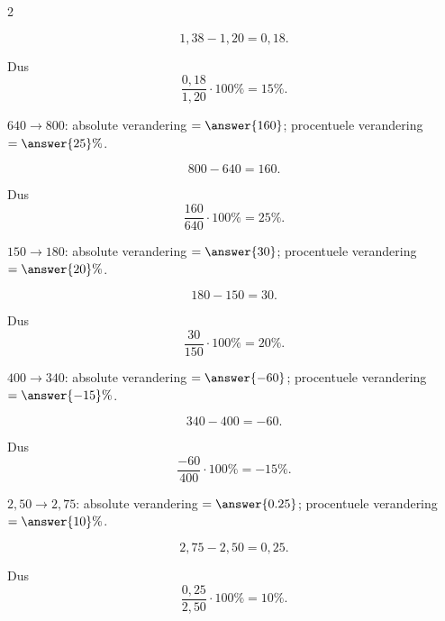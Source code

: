 \documentclass{ximera}
\begin{document}
\begin{oefening}{\oefB\ESS}
\begin{multicols}{2}
\begin{question}
    \begin{oplossing}
    \[
    1{,}38-1{,}20=0{,}18.
    \]
    
    Dus
    \[
    \dfrac{0{,}18}{1{,}20}\cdot100\%=15\%.
    \]
    \end{oplossing}
    \end{question}
    
    
    \begin{question}
    $640\to800$: absolute verandering $=\answer{160}$; procentuele verandering $=\answer{25}\%$.
    
    \begin{oplossing}
    \[
    800-640=160.
    \]
    
    Dus
    \[
    \dfrac{160}{640}\cdot100\%=25\%.
    \]
    \end{oplossing}
    \end{question}
    
    
    \begin{question}
    $150\to180$: absolute verandering $=\answer{30}$; procentuele verandering $=\answer{20}\%$.
    
    \begin{oplossing}
    \[
    180-150=30.
    \]
    
    Dus
    \[
    \dfrac{30}{150}\cdot100\%=20\%.
    \]
    \end{oplossing}
    \end{question}
    
    
    \begin{question}
    $400\to340$: absolute verandering $=\answer{-60}$; procentuele verandering $=\answer{-15}\%$.
    
    \begin{oplossing}
    \[
    340-400=-60.
    \]
    
    Dus
    \[
    \dfrac{-60}{400}\cdot100\%=-15\%.
    \]
    \end{oplossing}
    \end{question}
    
    
    \begin{question}
    $2{,}50\to2{,}75$: absolute verandering $=\answer{0.25}$; procentuele verandering $=\answer{10}\%$.
    
    \begin{oplossing}
    \[
    2{,}75-2{,}50=0{,}25.
    \]
    
    Dus
    \[
    \dfrac{0{,}25}{2{,}50}\cdot100\%=10\%.
    \]
    \end{oplossing}
    \end{question}
    

\end{multicols}
\end{oefening}
\end{document}

